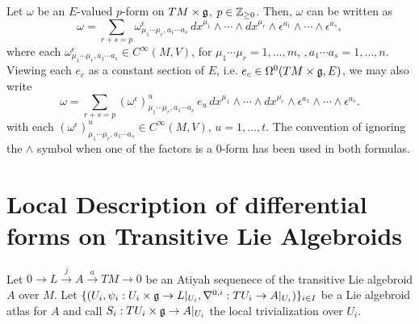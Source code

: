 \begin{proposition}\label{TheoremDecompOfVectorValuedFormsTLAEpsilonsDxs}
Let $\omega$ be an $E$-valued $p$-form on $TM \times \mathfrak{g}$, $p \in \mathbb{Z}_{\geq 0}$. Then, $\omega$ can be written as
\begin{equation}
    \omega = \sum_{r + s = p} \omega^\epsilon_{\mu_1 \cdots \mu_r, a_1 \cdots a_s}\, dx^{\mu_1} \wedge \cdots \wedge dx^{\mu_r} \wedge \epsilon^{a_1} \wedge \cdots \wedge \epsilon^{a_s},
\end{equation}
where each $\omega^\epsilon_{\mu_1 \cdots \mu_r, a_1 \cdots a_s} \in C^\infty(M, V)$, for $\mu_1 \cdots \mu_r = 1, \dots, m$, $, a_1 \cdots a_s = 1, \dots, n$. Viewing each $e_c$ as a constant section of $E$, i.e. $e_c \in \Omega^0(TM \times \mathfrak{g}, E)$, we may also write
\begin{equation}
    \omega = \sum_{r + s = p} \left(\omega^\epsilon\right)^u_{\mu_1 \cdots \mu_r, a_1 \cdots a_s}\, e_u \, dx^{\mu_1} \wedge \cdots \wedge dx^{\mu_r} \wedge \epsilon^{a_1} \wedge \cdots \wedge \epsilon^{a_s}.
\end{equation} 
with each $\left(\omega^\epsilon\right)^u_{\mu_1 \cdots \mu_r, a_1 \cdots a_s} \in C^\infty(M, V)$, $u = 1, \dots, t$.
The convention of ignoring the $\wedge$ symbol when one of the factors is a $0$-form has been used in both formulas.
\end{proposition}

\section{Local Description of differential forms on Transitive Lie Algebroids}
\label{ChFormsSectionLocaltransitive}

Let $0 \to L \xrightarrow{j} A \xrightarrow{a} TM \to 0$ be an Atiyah sequenece of the transitive Lie algebroid $A$ over $M$. Let $\{(U_i, \psi_i: U_i \times \mathfrak{g} \to L|_{U_i}, \nabla^{0, i}: TU_i \to A|_{U_i})\}_{i \in I}$ be a Lie algebroid atlas for $A$ and call $S_i: TU_i \times \mathfrak{g} \to A|_{U_i}$ the local trivialization over $U_i$.

